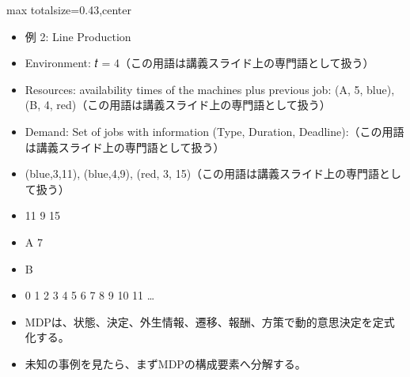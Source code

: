 \clearpage
{}
\begin{minipage}[t]{0.405\textwidth}
\begin{adjustbox}{max totalsize={\textwidth}{0.43\textheight},center}
\begin{minipage}{\textwidth}\scriptsize
{}\begin{itemize}
\item 例 2: Line Production
\item Environment: 𝑡 = 4（この用語は講義スライド上の専門語として扱う）
\item Resources: availability times of the machines plus previous job: (A, 5, blue), (B, 4, red)（この用語は講義スライド上の専門語として扱う）
\item Demand: Set of jobs with information (Type, Duration, Deadline):（この用語は講義スライド上の専門語として扱う）
\item (blue,3,11), (blue,4,9), (red, 3, 15)（この用語は講義スライド上の専門語として扱う）
\item 11 9 15
\item A 7
\item B
\item 0 1 2 3 4 5 6 7 8 9 10 11 …
\end{itemize}\begin{itemize}
\item MDPは、状態、決定、外生情報、遷移、報酬、方策で動的意思決定を定式化する。
\item 未知の事例を見たら、まずMDPの構成要素へ分解する。
\end{itemize}
\end{minipage}
\end{adjustbox}
\end{minipage}\hfill
